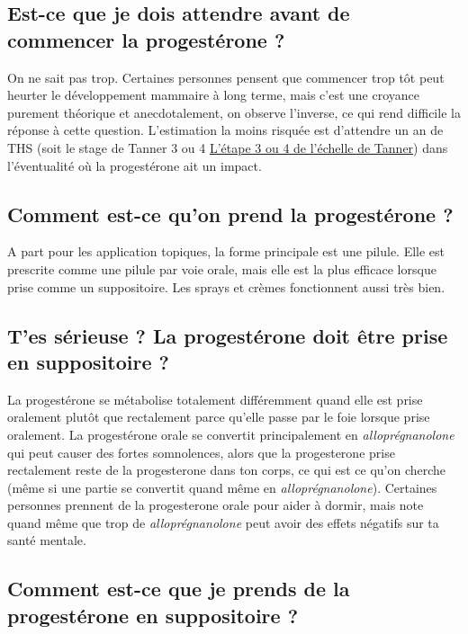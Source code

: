 \documentclass{article}
\begin{document}
\subsection{Est-ce que je dois attendre avant de commencer la progestérone ?}

On ne sait pas trop. Certaines personnes pensent que commencer trop tôt peut heurter le développement mammaire à long terme, mais c'est une croyance purement théorique et anecdotalement, on observe l'inverse, ce qui rend difficile la réponse à cette question. L'estimation la moins risquée est d'attendre un an de THS (soit le stage de Tanner 3 ou 4 \href{https://en.wikipedia.org/wiki/File:Tanner_scale-female.svg}{L'étape 3 ou 4 de l'échelle de Tanner}) dans l'éventualité où la progestérone ait un impact. 

\subsection{Comment est-ce qu'on prend la progestérone ?}

A part pour les application topiques, la forme principale est une pilule. Elle est prescrite comme une pilule par voie orale, mais elle est la plus efficace lorsque prise comme un suppositoire. Les sprays et crèmes fonctionnent aussi très bien. 

\subsection{T'es sérieuse ? La progestérone doit être prise en suppositoire ?}

La progestérone se métabolise totalement différemment quand elle est prise oralement plutôt que rectalement parce qu'elle passe par le foie lorsque prise oralement. La progestérone orale se convertit principalement en \textit{alloprégnanolone} qui peut causer des fortes somnolences, alors que la progesterone prise rectalement reste de la progesterone dans ton corps, ce qui est ce qu'on cherche (même si une partie se convertit quand même en \textit{alloprégnanolone}). Certaines personnes prennent de la progesterone orale pour aider à dormir, mais note quand même que trop de \textit{alloprégnanolone} peut avoir des effets négatifs sur ta santé mentale.

\subsection{Comment est-ce que je prends de la progestérone en suppositoire ?}
\end{document}
